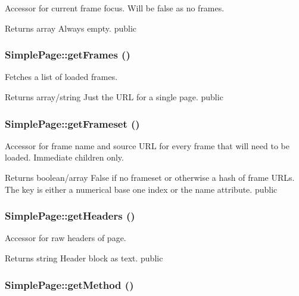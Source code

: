 Accessor for current frame focus. Will be false as no frames. \begin{DoxyReturn}{Returns}
array Always empty.  public 
\end{DoxyReturn}
\hypertarget{class_simple_page_aaf191dd98af63ad6d6672b68e0c69bb1}{
\subsubsection[{getFrames}]{\setlength{\rightskip}{0pt plus 5cm}SimplePage::getFrames ()}}
\label{class_simple_page_aaf191dd98af63ad6d6672b68e0c69bb1}
Fetches a list of loaded frames. \begin{DoxyReturn}{Returns}
array/string Just the URL for a single page.  public 
\end{DoxyReturn}
\hypertarget{class_simple_page_a2900034ec3ae1d64358c2ac81cd94d83}{
\subsubsection[{getFrameset}]{\setlength{\rightskip}{0pt plus 5cm}SimplePage::getFrameset ()}}
\label{class_simple_page_a2900034ec3ae1d64358c2ac81cd94d83}
Accessor for frame name and source URL for every frame that will need to be loaded. Immediate children only. \begin{DoxyReturn}{Returns}
boolean/array False if no frameset or otherwise a hash of frame URLs. The key is either a numerical base one index or the name attribute.  public 
\end{DoxyReturn}
\hypertarget{class_simple_page_a93610bd4dd5bc00af5adc293704c4d8c}{
\subsubsection[{getHeaders}]{\setlength{\rightskip}{0pt plus 5cm}SimplePage::getHeaders ()}}
\label{class_simple_page_a93610bd4dd5bc00af5adc293704c4d8c}
Accessor for raw headers of page. \begin{DoxyReturn}{Returns}
string Header block as text.  public 
\end{DoxyReturn}
\hypertarget{class_simple_page_a315e80110ab689b07804a4cf93b019d3}{
\subsubsection[{getMethod}]{\setlength{\rightskip}{0pt plus 5cm}SimplePage::getMethod ()}}
